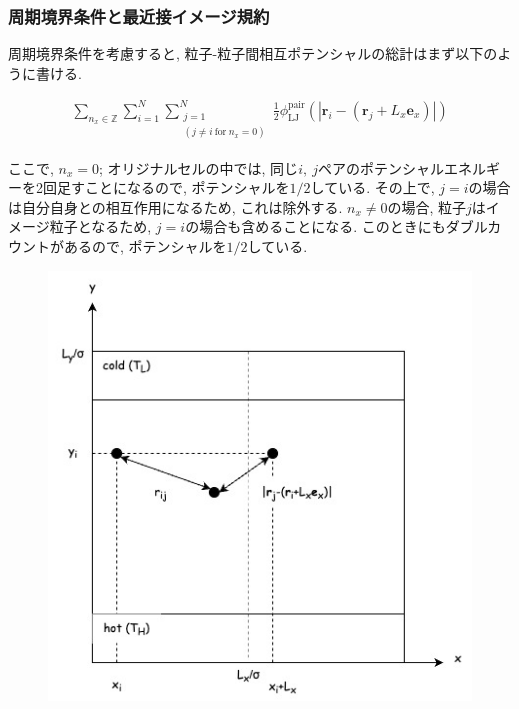 \documentclass[dvipdfmx]{jsarticle}
\numberwithin{equation}{subsection}
\begin{document}

\subsubsection{周期境界条件と最近接イメージ規約}

周期境界条件を考慮すると, 粒子-粒子間相互ポテンシャルの総計はまず以下のように書ける.

\begin{align}
  \sum_{n_x \in \mathbb{Z}} \sum_{i=1}^{N} \sum_{\substack{j=1 \\ (j \neq i \ \text{for} \ n_{x} = 0)}}^{N} \frac{1}{2} \phi_{\text{LJ}}^{\text{pair}}(|\bm{r}_i -(\bm{r}_j + L_x \bm{e}_x)|)
\end{align}

ここで, $n_x = 0$; オリジナルセルの中では, 同じ$i,\ j$ペアのポテンシャルエネルギーを2回足すことになるので, ポテンシャルを$1/2$している. その上で, $j = i$の場合は自分自身との相互作用になるため, これは除外する. $n_x \neq 0$の場合, 粒子$j$はイメージ粒子となるため, $j=i$の場合も含めることになる. このときにもダブルカウントがあるので, ポテンシャルを$1/2$している.

\begin{figure}[H]
  \centering
  \caption{}
  \label{fig:system_periodic}
  \includegraphics[scale=0.7]{image/system_periodic.jpg}
\end{figure}
\end{document}
